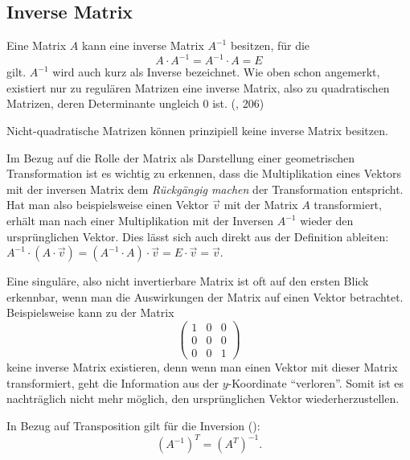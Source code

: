 \subsection{Inverse Matrix}
\label{inversion}
Eine Matrix $A$ kann eine inverse Matrix $A^{-1}$ besitzen, für die
\begin{equation}
 A \cdot A^{-1} = A^{-1} \cdot A = E
\end{equation}
gilt. $A^{-1}$ wird auch kurz als Inverse bezeichnet. Wie oben schon angemerkt, existiert nur zu regulären Matrizen eine inverse Matrix, also zu quadratischen Matrizen, deren Determinante ungleich $0$ ist. (\vgl \citep{bronstein}, 206)

Nicht-quadratische Matrizen können prinzipiell keine inverse Matrix besitzen.

Im Bezug auf die Rolle der Matrix als Darstellung einer geometrischen Transformation ist es wichtig zu erkennen, dass die Multiplikation eines Vektors mit der inversen Matrix dem \emph{Rückgängig machen} der Transformation entspricht. Hat man also beispielsweise einen Vektor $\vec v$ mit der Matrix $A$ transformiert, erhält man nach einer Multiplikation mit der Inversen $A^{-1}$ wieder den ursprünglichen Vektor. Dies lässt sich auch direkt aus der Definition ableiten: $A^{-1} \cdot ( A \cdot \vec v ) = (A^{-1} \cdot A) \cdot \vec v = E \cdot \vec v = \vec v$.

Eine singuläre, also nicht invertierbare Matrix ist oft auf den ersten Blick erkennbar, wenn man die Auswirkungen der Matrix auf einen Vektor betrachtet. Beispielsweise kann zu der Matrix
\begin{equation}
 \begin{pmatrix}
  1 & 0 & 0 \\
  0 & 0 & 0 \\
  0 & 0 & 1
 \end{pmatrix}
\end{equation}
keine inverse Matrix existieren, denn wenn man einen Vektor mit dieser Matrix transformiert, geht die Information aus der $y$-Koordinate \enquote{verloren}. Somit ist es nachträglich nicht mehr möglich, den ursprünglichen Vektor wiederherzustellen.

In Bezug auf Transposition gilt für die Inversion (\vgl \citep{wiki:inverse}):
\begin{equation}
 (A^{-1})^T = (A^T)^{-1}.
\end{equation}

